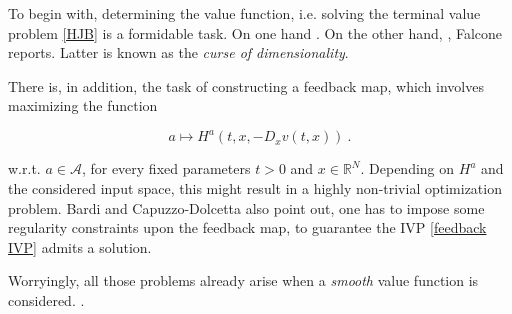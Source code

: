 To begin with, determining the value function, i.e. solving the terminal value problem \eqref{HJB} is a formidable task. On one hand  \cite{zhou}. On the other hand, , Falcone \cite{bardi2008optimal} reports. Latter is known as the \emph{curse of dimensionality}.

There is, in addition, the task of constructing a feedback map, which involves maximizing the function

\begin{equation*}
	a \mapsto H^{a}(t, x, -D_x v(t, x)) \ .
\end{equation*}

w.r.t. $ a \in \mathcal{A} $, for every fixed parameters $ t > 0 $ and $ x \in \mathbb{R}^N $. Depending on $ H^{a} $ and the considered input space, this might result in a highly non-trivial optimization problem. Bardi and Capuzzo-Dolcetta \cite{bardi2008optimal} also point out, one has to impose some regularity constraints upon the feedback map, to guarantee the IVP \eqref{feedback IVP} admits a solution.

Worryingly, all those problems already arise when a \emph{smooth} value function is considered.  \cite{bardi2008optimal}.


